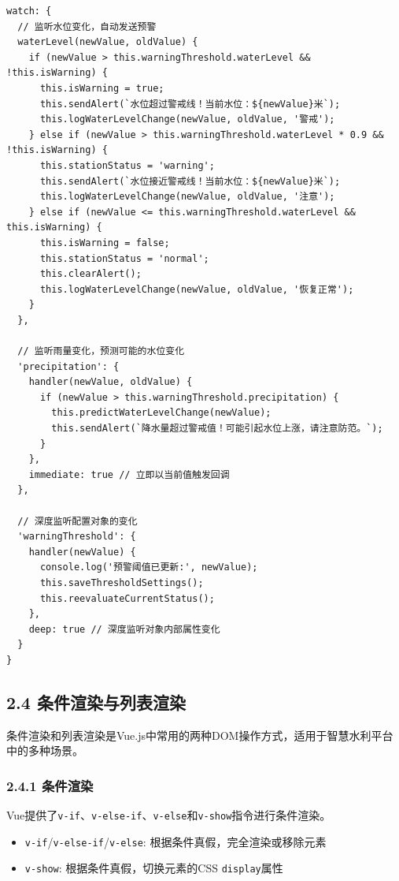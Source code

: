 \begin{lstlisting}
watch: {
  // 监听水位变化，自动发送预警
  waterLevel(newValue, oldValue) {
    if (newValue > this.warningThreshold.waterLevel && !this.isWarning) {
      this.isWarning = true;
      this.sendAlert(`水位超过警戒线！当前水位：${newValue}米`);
      this.logWaterLevelChange(newValue, oldValue, '警戒');
    } else if (newValue > this.warningThreshold.waterLevel * 0.9 && !this.isWarning) {
      this.stationStatus = 'warning';
      this.sendAlert(`水位接近警戒线！当前水位：${newValue}米`);
      this.logWaterLevelChange(newValue, oldValue, '注意');
    } else if (newValue <= this.warningThreshold.waterLevel && this.isWarning) {
      this.isWarning = false;
      this.stationStatus = 'normal';
      this.clearAlert();
      this.logWaterLevelChange(newValue, oldValue, '恢复正常');
    }
  },
  
  // 监听雨量变化，预测可能的水位变化
  'precipitation': {
    handler(newValue, oldValue) {
      if (newValue > this.warningThreshold.precipitation) {
        this.predictWaterLevelChange(newValue);
        this.sendAlert(`降水量超过警戒值！可能引起水位上涨，请注意防范。`);
      }
    },
    immediate: true // 立即以当前值触发回调
  },
  
  // 深度监听配置对象的变化
  'warningThreshold': {
    handler(newValue) {
      console.log('预警阈值已更新:', newValue);
      this.saveThresholdSettings();
      this.reevaluateCurrentStatus();
    },
    deep: true // 深度监听对象内部属性变化
  }
}
\end{lstlisting}

\subsection{2.4
条件渲染与列表渲染}\label{ux6761ux4ef6ux6e32ux67d3ux4e0eux5217ux8868ux6e32ux67d3}

条件渲染和列表渲染是Vue.js中常用的两种DOM操作方式，适用于智慧水利平台中的多种场景。

\subsubsection{2.4.1 条件渲染}\label{ux6761ux4ef6ux6e32ux67d3}

Vue提供了\passthrough{\lstinline!v-if!}、\passthrough{\lstinline!v-else-if!}、\passthrough{\lstinline!v-else!}和\passthrough{\lstinline!v-show!}指令进行条件渲染。

\begin{itemize}
\tightlist
\item
  \passthrough{\lstinline!v-if!}/\passthrough{\lstinline!v-else-if!}/\passthrough{\lstinline!v-else!}:
  根据条件真假，完全渲染或移除元素
\item
  \passthrough{\lstinline!v-show!}: 根据条件真假，切换元素的CSS
  \passthrough{\lstinline!display!}属性
\end{itemize}

